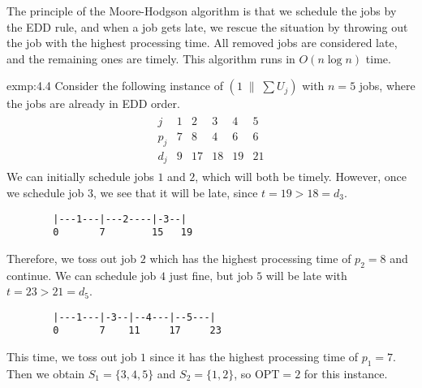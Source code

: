The principle of the Moore-Hodgson algorithm is that we schedule the jobs by the EDD 
rule, and when a job gets late, we rescue the situation by throwing out the job with 
the highest processing time. All removed jobs are considered late, and the remaining 
ones are timely. This algorithm runs in $O(n\log n)$ time. 

\begin{exmp}{exmp:4.4}
    Consider the following instance of $(1 \;\|\; \sum U_j)$ with $n = 5$ jobs, 
    where the jobs are already in EDD order.  
    \begin{align*}
        \begin{array}{c|ccccc}
            j   & 1 & 2  & 3  & 4  & 5 \\ \hline 
            p_j & 7 & 8  & 4  & 6  & 6 \\ 
            d_j & 9 & 17 & 18 & 19 & 21
        \end{array}
    \end{align*}
    We can initially schedule jobs $1$ and $2$, which will both be timely. However, 
    once we schedule job $3$, we see that it will be late, since $t = 19 > 18 = d_3$.
    \begin{verbatim}
        |---1---|---2----|-3--|
        0       7        15   19
    \end{verbatim}
    \vspace{-1em}
    Therefore, we toss out job $2$ which has the highest processing time of $p_2 = 8$
    and continue. We can schedule job $4$ just fine, but job $5$ will be late with 
    $t = 23 > 21 = d_5$. 
    \begin{verbatim}
        |---1---|-3--|--4---|--5---|
        0       7    11     17     23
    \end{verbatim}
    \vspace{-1em}
    This time, we toss out job $1$ since it has the highest processing time of $p_1 = 7$. 
    Then we obtain $S_1 = \{3, 4, 5\}$ and $S_2 = \{1, 2\}$, so $\text{OPT} = 2$ for 
    this instance. 
\end{exmp}
 